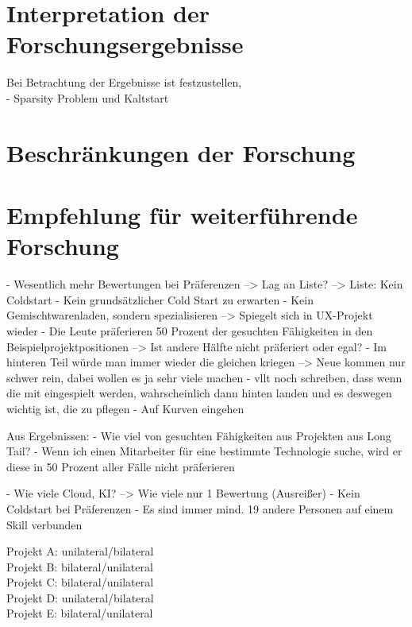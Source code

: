 \newpage
\section{Interpretation der Forschungsergebnisse}
\label{ch:diskussion:interpretation}
Bei Betrachtung der Ergebnisse ist festzustellen, \\
- Sparsity Problem und Kaltstart

\section{Beschränkungen der Forschung}
\label{ch:diskussion:beschraenkungen}

\section{Empfehlung für weiterführende Forschung}
\label{ch:diskussion:empfehlungen}
- Wesentlich mehr Bewertungen bei Präferenzen --> Lag an Liste? --> Liste: Kein Coldstart
- Kein grundsätzlicher Cold Start zu erwarten
- Kein Gemischtwarenladen, sondern spezialisieren --> Spiegelt sich in UX-Projekt wieder
- Die Leute präferieren 50 Prozent der gesuchten Fähigkeiten in den Beispielprojektpositionen --> Ist andere Hälfte nicht präferiert oder egal?
- Im hinteren Teil würde man immer wieder die gleichen kriegen --> Neue kommen nur schwer rein, dabei wollen es ja sehr viele machen
- vllt noch schreiben, dass wenn die mit eingespielt werden, wahrscheinlich dann hinten landen und es deswegen wichtig ist, die zu pflegen
- Auf Kurven eingehen

Aus Ergebnissen:
- Wie viel von gesuchten Fähigkeiten aus Projekten aus Long Tail?
- Wenn ich einen Mitarbeiter für eine bestimmte Technologie suche, wird er diese in 50 Prozent aller Fälle nicht präferieren

- Wie viele Cloud, KI? --> Wie viele nur 1 Bewertung (Ausreißer)
- Kein Coldstart bei Präferenzen
- Es sind immer mind. 19 andere Personen auf einem Skill verbunden

Projekt A: unilateral/bilateral\\
Projekt B: bilateral/unilateral\\
Projekt C: bilateral/unilateral\\
Projekt D: unilateral/bilateral\\
Projekt E: bilateral/unilateral


